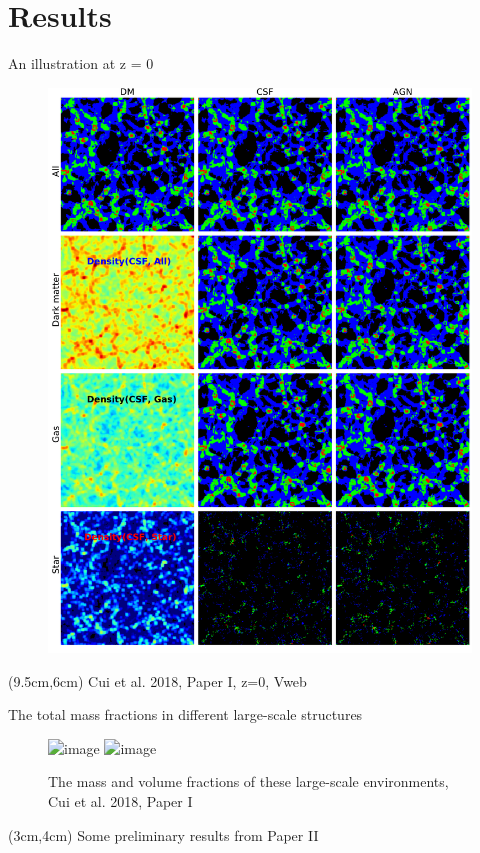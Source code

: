 \documentclass[aspectratio=43]{beamer}
\begin{document}
\section{Results}
\begin{frame}{An illustration at z = 0}
  \begin{figure}
    \includegraphics[width=0.5\linewidth]{image_show_V}
  \end{figure}
  \begin{textblock*}{3cm}(9.5cm,6cm)
    {Cui et al. 2018, Paper I, z=0, Vweb}
  \end{textblock*}
\end{frame}

\begin{frame}{The total mass fractions in different large-scale structures}
  \begin{figure}
    \includegraphics<1>[width=\linewidth]{Fractions-BE}
    \includegraphics<2>[width=\linewidth]{Fractions-gasweb}
    \caption{The mass and volume fractions of these large-scale environments, Cui et al. 2018, Paper I}
  \end{figure}
\end{frame}

\begin{frame}
  \begin{textblock*}{8cm}(3cm,4cm)
    {\Huge Some preliminary results from Paper II}
  \end{textblock*}
\end{frame}
\end{document}
